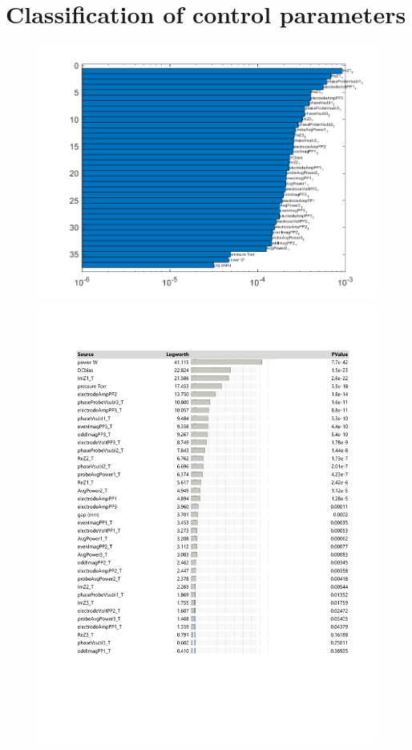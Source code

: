 \documentclass[12pt]{iopart}
\begin{document}
\section{Classification of control parameters}\label{Sect:Classification}


\begin{figure}[ht!]
\begin{center}
\begin{minipage}{0.5\textwidth}
    \includegraphics[width=1\textwidth]{input-importance-curvature-testSpecies.png}
\end{minipage}
\begin{minipage}{0.5\textwidth}
    \includegraphics[width=1\textwidth]{jmpSpecies.pdf}
\end{minipage}


\end{center}
\end{figure}
\end{document}
